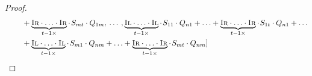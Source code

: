 \begin{proof}
\begin{equation}
\begin{split}
     & \hspace{22pt}  + \underbrace{\textsc{Ir} \cdot \ldots \cdot \textsc{Ir}}_{t-1 \times}\cdot \hspace{1pt} S_{mt} \cdot Q_{1m}, \hspace{2pt} \ldots  \hspace{2pt},  \underbrace{\textsc{Il} \cdot \ldots \cdot \textsc{Il}}_{t-1 \times} \cdot \hspace{1pt} S_{11} \cdot Q_{n1} + \ldots +   \underbrace{\textsc{Ir} \cdot \ldots \cdot \textsc{Ir}}_{t-1 \times}\cdot \hspace{1pt} S_{1t} \cdot Q_{n1} + \ldots   \\
     & \hspace{22pt} +  \underbrace{\textsc{Il} \cdot \ldots \cdot \textsc{Il}}_{t-1 \times} \cdot\hspace{1pt} S_{m1} \cdot Q_{nm} + \ldots + \underbrace{\textsc{Ir} \cdot \ldots \cdot \textsc{Ir}}_{t-1 \times}\cdot \hspace{1pt} S_{mt} \cdot Q_{nm}]
  \end{split}
\end{equation}






\end{proof}
